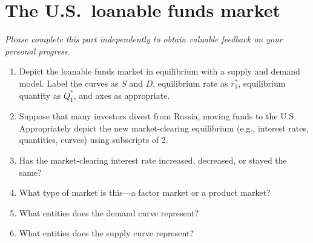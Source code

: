 \documentclass{assignment}
\begin{document}
\vspace{-1\baselineskip}
\clearpage

\section{The U.S.~loanable funds market}

\emph{Please complete this part independently to obtain valuable feedback on your personal progress.}

\begin{center}
\vspace{18pt}
\end{center}

\begin{enumerate}

\item Depict the loanable funds market in equilibrium with a supply and demand model. Label the curves as $S$ and $D$, equilibrium rate as $r^*_1$, equilibrium quantity as $Q^*_1$, and axes as appropriate.

\item Suppose that many investors divest from Russia, moving funds to the U.S. Appropriately depict the new market-clearing equilibrium (e.g., interest rates, quantities, curves) using subscripts of 2.

\item Has the market-clearing interest rate increased, decreased, or stayed the same?

\vfill

\item What type of market is this---a factor market or a product market?

\vfill

\item What entities does the demand curve represent?

\vfill

\item What entities does the supply curve represent?

\vfill

\vspace{-1\baselineskip}

\end{enumerate}
\end{document}
